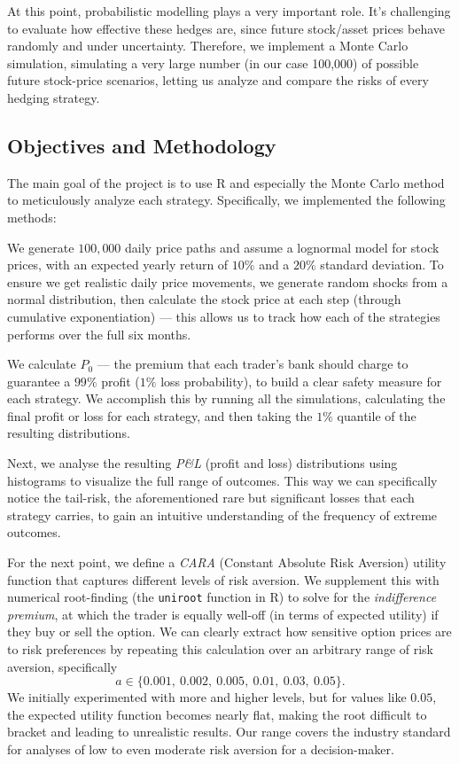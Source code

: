 \documentclass[11pt,a4paper]{article}
\begin{document}
	At this point, probabilistic modelling plays a very important role. It’s challenging to evaluate how effective these hedges are, since future stock/asset prices behave randomly and under uncertainty. Therefore, we implement a Monte Carlo simulation, simulating a very large number (in our case 100{,}000) of possible future stock-price scenarios, letting us analyze and compare the risks of every hedging strategy.
	
	\subsection{Objectives and Methodology}
The main goal of the project is to use R and especially the Monte Carlo method to meticulously analyze each strategy. Specifically, we implemented the following methods:

We generate \(100{,}000\) daily price paths and assume a lognormal model for stock prices, with an expected yearly return of \(10\%\) and a \(20\%\) standard deviation. To ensure we get realistic daily price movements, we generate random shocks from a normal distribution, then calculate the stock price at each step (through cumulative exponentiation) --- this allows us to track how each of the strategies performs over the full six months.

We calculate \(P_0\) --- the premium that each trader’s bank should charge to guarantee a \(99\%\) profit (\(1\%\) loss probability), to build a clear safety measure for each strategy. We accomplish this by running all the simulations, calculating the final profit or loss for each strategy, and then taking the \(1\%\) quantile of the resulting distributions.

Next, we analyse the resulting \textit{P\&L} (profit and loss) distributions using histograms to visualize the full range of outcomes. This way we can specifically notice the tail-risk, the aforementioned rare but significant losses that each strategy carries, to gain an intuitive understanding of the frequency of extreme outcomes.

For the next point, we define a \textit{CARA} (Constant Absolute Risk Aversion) utility function that captures different levels of risk aversion. We supplement this with numerical root-finding (the \texttt{uniroot} function in R) to solve for the \textit{indifference premium}, at which the trader is equally well-off (in terms of expected utility) if they buy or sell the option. We can clearly extract how sensitive option prices are to risk preferences by repeating this calculation over an arbitrary range of risk aversion, specifically
\[
a \in \{0.001,\ 0.002,\ 0.005,\ 0.01,\ 0.03,\ 0.05\}.
\]
We initially experimented with more and higher levels, but for values like \(0.05\), the expected utility function becomes nearly flat, making the root difficult to bracket and leading to unrealistic results. Our range covers the industry standard for analyses of low to even moderate risk aversion for a decision-maker.
\end{document}
